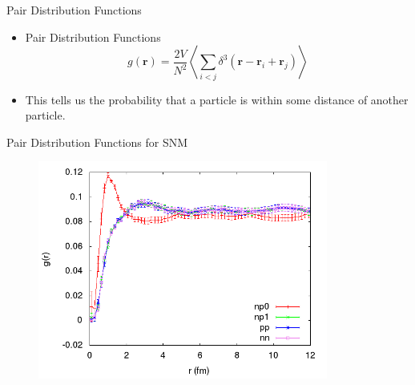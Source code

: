 \documentclass{beamer}
\begin{document}
\begin{frame}{Pair Distribution Functions}
\begin{itemize}
   \item Pair Distribution Functions
   \begin{equation*}
      g(\mathbf{r})=\frac{2V}{N^2}\left<\sum\limits_{i<j}\delta^3\left(\mathbf{r}-\mathbf{r}_i+\mathbf{r}_j\right)\right>
   \end{equation*}
   \item This tells us the probability that a particle is within some distance of another particle.
\end{itemize}
\end{frame}

\begin{frame}{Pair Distribution Functions for SNM}
   \begin{figure}[h]
      \centering
      \includegraphics[width=0.85\textwidth]{figures/gofr.png}
   \end{figure}
\end{frame}
\end{document}

